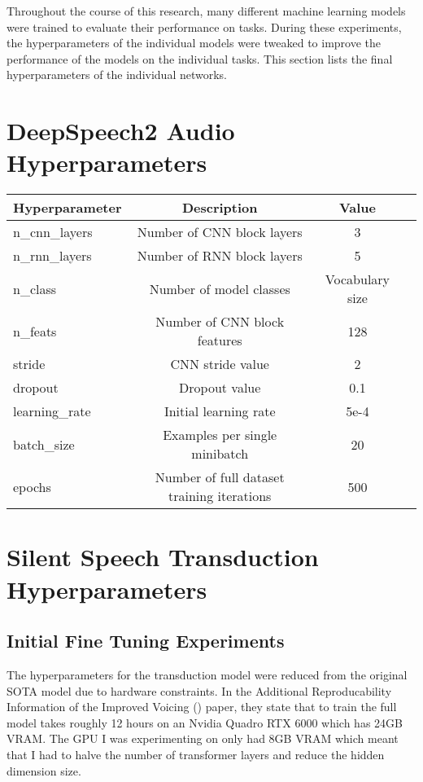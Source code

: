 Throughout the course of this research, many different machine learning models were
trained to evaluate their performance on tasks. During these experiments,
the hyperparameters of the individual models were tweaked to improve the performance of
the models on the individual tasks. This section lists the final hyperparameters of
the individual networks.

\section{DeepSpeech2 Audio Hyperparameters}


{\small\begin{center}
\begin{tabular} { | l | c | c | c | }
\hline
Hyperparameter & Description & Value \\
\hline
n\_cnn\_layers & Number of CNN block layers & 3 \\
n\_rnn\_layers & Number of RNN block layers & 5 \\
n\_class & Number of model classes & Vocabulary size \\
n\_feats & Number of CNN block features & 128 \\
stride & CNN stride value & 2 \\
dropout & Dropout value & 0.1 \\
learning\_rate & Initial learning rate & 5e-4 \\
batch\_size & Examples per single minibatch & 20 \\
epochs & Number of full dataset training iterations & 500 \\
\hline
\end{tabular}
\end{center}}

\section{Silent Speech Transduction Hyperparameters}

\subsection{Initial Fine Tuning Experiments}

The hyperparameters for the transduction model were reduced from the original
SOTA model due to hardware constraints. In the Additional Reproducability
Information of the Improved Voicing (\cite{gaddy2021improved}) paper, they state
that to train the full model takes roughly 12 hours on an Nvidia Quadro RTX 6000
which has 24GB VRAM. The GPU I was experimenting on only had 8GB VRAM which meant
that I had to halve the number of transformer layers and reduce the hidden dimension
size.

